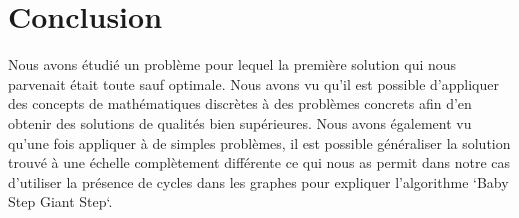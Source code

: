 \section{Conclusion}

Nous avons étudié un problème pour lequel la première solution qui nous parvenait était toute sauf optimale. Nous avons vu qu'il est possible d'appliquer des concepts de mathématiques discrètes à des problèmes concrets afin d'en obtenir des solutions de qualités bien supérieures.
Nous avons également vu qu'une fois appliquer à de simples problèmes, il est possible généraliser la solution trouvé à une échelle complètement différente ce qui nous as permit dans notre cas d'utiliser la présence de cycles dans les graphes pour expliquer l'algorithme `Baby Step Giant Step`.
